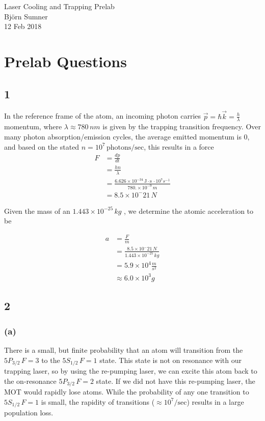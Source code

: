 \documentclass[12pt]{article}
\begin{document}
\begin{center}
{\Large Laser Cooling and Trapping Prelab} \\[.3in]
{\large Bj\"{o}rn Sumner} \\
{12 Feb 2018}
\end{center}

\section*{Prelab Questions}

\subsection*{1}

In the reference frame of the atom, an incoming photon carries $\vec{p}=\hbar \vec{k}=\frac{h}{\lambda}$ momentum, where $\lambda \approx 780\,nm$ is given by the trapping transition frequency.  Over many photon absorption/emission cycles, the average emitted momentum is $0$, and based on the stated $n = 10^7 \,\text{photons}/\text{sec}$, this results in a force
\begin{align*}
	F &= \frac{dp}{dt}\\
	&= \frac{hn}{\lambda}\\
	&= \frac{6.626\times10^{-34}\,\text{J}\cdot\text{s} \,\cdot 10^7 s^{-1}}{780.\times 10^{-9}\,m}\\
	&= 8.5 \times 10^-21\,N
\end{align*}

Given the mass of an $1.443\times 10^{-25}\,kg$ \cite{steck87Rb}, we determine the atomic acceleration to be

\begin{align*}
	a &= \frac{F}{m}\\
	&= \frac{8.5 \times 10^-21\,N}{1.443\times 10^{-25}\,kg}\\
	&= 5.9\times 10^4 \frac{m}{s^2}\\
	&\approx 6.0\times 10^3 g
\end{align*}

\subsection*{2}

\subsubsection*{(a)}

There is a small, but finite probability that an atom will transition from the $5P_{3/2}\, F=3$ to the $5S_{1/2}\, F=1$ state.  This state is not on resonance with our trapping laser, so by using the re-pumping laser, we can excite this atom back to the on-resonance $5P_{3/2}\, F=2$ state.  If we did not have this re-pumping laser, the MOT would rapidly lose atoms.  While the probability of any one transition to $5S_{1/2}\, F=1$ is small, the rapidity of transitions ($\approx 10^7/\text{sec}$) results in a large population loss.
\end{document}
